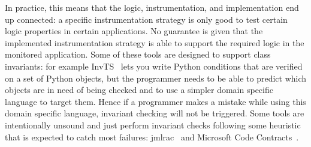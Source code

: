 In practice, this means that the logic, instrumentation, and implementation end up connected:
a specific instrumentation strategy is only good to test certain logic properties in certain applications.
No guarantee is given that the implemented instrumentation strategy is able to support the required logic in the monitored application.
Some of these tools are designed to support class invariants: for example InvTS~\cite{gorbovitski08efficient} lets you write Python conditions that are verified on a set of Python objects, but the programmer needs to be able
to predict which objects are in need of being checked and to use a simpler domain specific language to target them. Hence if a programmer makes a mistake while using this domain specific language, invariant checking
will not be triggered.
Some tools are intentionally unsound and just perform invariant checks following some heuristic that is expected to catch most failures: jmlrac~\cite{Burdy2005} and Microsoft Code Contracts~\cite{fahndrich2010embedded}.







%
%

